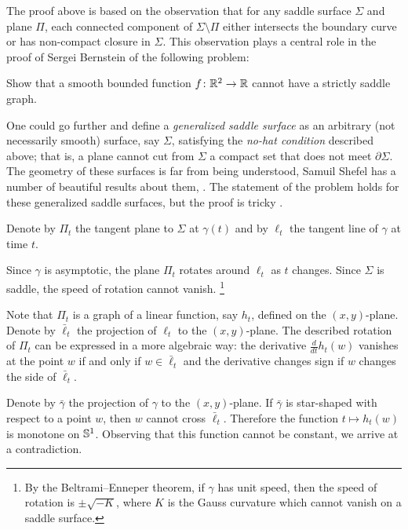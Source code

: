 The proof above is based on the observation 
that for any saddle surface $\Sigma$ and plane $\Pi$,
each connected component of $\Sigma\setminus \Pi$ either intersects the boundary curve or has non-compact closure in $\Sigma$.
This observation plays a central role in the proof of Sergei Bernstein \cite{bernshtein}
of the following problem:

\begin{pr}
Show that a smooth bounded function $f\colon\mathbb{R}^2\to\mathbb{R}$ cannot have a strictly saddle graph.
\end{pr}

One could go further and define a \emph{generalized saddle surface} as an arbitrary (not necessarily smooth) surface, say $\Sigma$, satisfying the \emph{no-hat condition} described above;
that is, a plane cannot cut from $\Sigma$ a compact set that does not meet $\partial \Sigma$.
The geometry of these surfaces is far from being understood,
Samuil Shefel has a number of beautiful results about them, 
\cite[see][and the references therein]{shefel, AKP-invitation}.
The statement of the problem holds for these generalized saddle surfaces, but
the proof is tricky \cite{petrunin-stadler}.


Denote by $\Pi_t$ the tangent plane to $\Sigma$ at $\gamma(t)$ and by $\ell_t$ the tangent line of $\gamma$ at time $t$.

Since $\gamma$ is asymptotic, the plane $\Pi_t$ rotates around $\ell_t$ as $t$ changes.
Since $\Sigma$ is saddle, the speed of rotation cannot vanish.%
\footnote{By the Beltrami--Enneper theorem, if $\gamma$ has unit speed, then the speed of rotation is $\pm\sqrt{-K}$, where $K$ is the Gauss curvature which cannot vanish on a saddle surface.}

Note that $\Pi_t$ is a graph of a linear function, say $h_t$, defined on the $(x, y)$-plane.
Denote by $\bar\ell_t$ the projection of $\ell_t$ to the $(x, y)$-plane.
The described rotation of $\Pi_t$ can be expressed in a more algebraic way:
the derivative $\tfrac{d}{dt}h_t(w)$ vanishes at the point $w$ if and only if $w\in \bar\ell_t$ 
and the derivative changes sign if $w$ changes the side of $\bar\ell_t$.

Denote by $\bar\gamma$ the projection of $\gamma$ to the $(x, y)$-plane.
If $\bar\gamma$ is star-shaped with respect to a point $w$, then $w$ cannot cross $\bar\ell_t$.
Therefore the function $t\mapsto h_t(w)$ is monotone on $\mathbb{S}^1$.
Observing that this function cannot be constant, we arrive at a contradiction.\qeds

